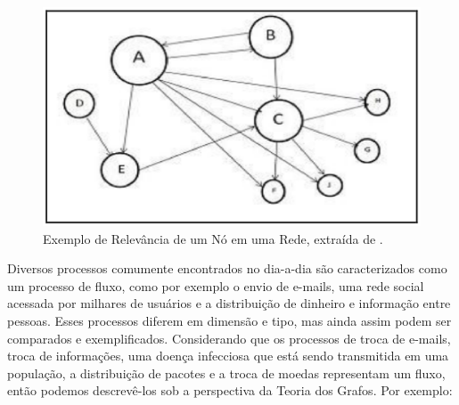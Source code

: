 \begin{figure}[!h]
    \centering
        \includegraphics[keepaspectratio=true,scale=0.5]{figuras/centrality.eps}
    \caption{Exemplo de Relevância de um Nó em uma Rede, extraída de \protect \cite{muppidi}.}
    \label{fig:centrality}
\end{figure}

Diversos processos comumente encontrados no dia-a-dia são caracterizados como um processo de fluxo, como por exemplo o envio de e-mails, uma rede social acessada por milhares de usuários e a distribuição de dinheiro e informação entre pessoas. Esses processos diferem em dimensão e tipo, mas ainda assim podem ser comparados e exemplificados. Considerando que os processos de troca de e-mails, troca de informações, uma doença infecciosa que está sendo transmitida em uma população, a distribuição de pacotes e a troca de moedas representam um fluxo, então podemos descrevê-los sob a perspectiva da Teoria dos Grafos\cite{ceflow}. Por exemplo:

